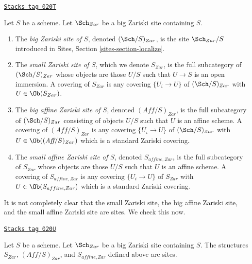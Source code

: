 \begin{definition}
\label{topologies-definition-big-small-Zariski}
\href{https://stacks.math.columbia.edu/tag/020T}{\texttt{Stacks tag 020T}}

Let $S$ be a scheme. Let $\Sch_{Zar}$ be a big Zariski
site containing $S$.
\begin{enumerate}
\item The {\it big Zariski site of $S$}, denoted
$(\Sch/S)_{Zar}$, is the site $\Sch_{Zar}/S$
introduced in Sites, Section \ref{sites-section-localize}.
\item The {\it small Zariski site of $S$}, which we denote
$S_{Zar}$, is the full subcategory of $(\Sch/S)_{Zar}$
whose objects are those $U/S$ such that $U \to S$ is an open immersion.
A covering of $S_{Zar}$ is any covering $\{U_i \to U\}$ of
$(\Sch/S)_{Zar}$ with $U \in \Ob(S_{Zar})$.
\item The {\it big affine Zariski site of $S$}, denoted
$(\textit{Aff}/S)_{Zar}$, is the full subcategory of
$(\Sch/S)_{Zar}$ consisting of objects $U/S$ such that $U$ is an
affine scheme. A covering of $(\textit{Aff}/S)_{Zar}$ is any covering
$\{U_i \to U\}$ of $(\Sch/S)_{Zar}$ with $U \in \Ob((\textit{Aff}/S)_{Zar})$
which is a standard Zariski covering.
\item The {\it small affine Zariski site of $S$}, denoted
$S_{affine, Zar}$, is the full subcategory of $S_{Zar}$
whose objects are those $U/S$ such that $U$ is an affine scheme.
A covering of $S_{affine, Zar}$ is any covering $\{U_i \to U\}$ of
$S_{Zar}$ with $U \in \Ob(S_{affine, Zar})$
which is a standard Zariski covering.
\end{enumerate}
\end{definition}

It is not completely clear that the small Zariski site,
the big affine Zariski site, and the small affine Zariski site
are sites. We check this now.

\begin{lemma}
\label{topologies-lemma-verify-site-Zariski}
\href{https://stacks.math.columbia.edu/tag/020U}{\texttt{Stacks tag 020U}}

Let $S$ be a scheme. Let $\Sch_{Zar}$ be a big Zariski
site containing $S$. The structures $S_{Zar}$, $(\textit{Aff}/S)_{Zar}$,
and $S_{affine, Zar}$ defined above are sites.
\end{lemma}

